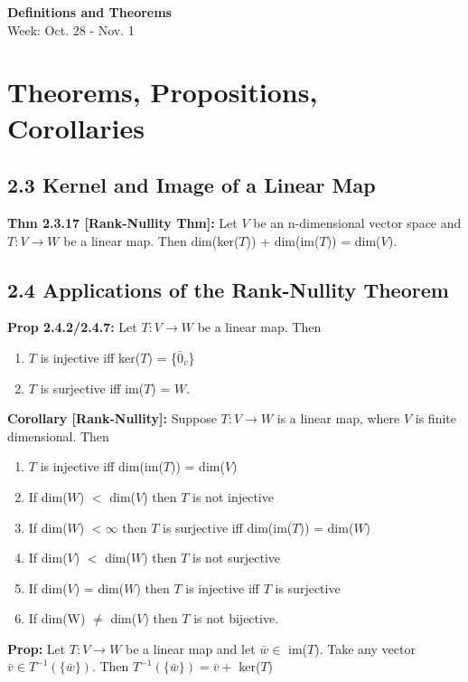 \noindent
\textbf{\LARGE Definitions and Theorems} \\
\large Week: Oct. 28 - Nov. 1

\normalsize


\section*{Theorems, Propositions, Corollaries}
\subsection*{2.3 Kernel and Image of a Linear Map}

\textbf{Thm 2.3.17 [Rank-Nullity Thm]:} Let $V$ be an n-dimensional vector space and $T: V \rightarrow W$ be a linear map. Then dim(ker($T$)) + dim(im($T$)) = dim($V$).

\subsection*{2.4 Applications of the Rank-Nullity Theorem}

\textbf{Prop 2.4.2/2.4.7:} Let $T: V \rightarrow W$ be a linear map. Then
\begin{enumerate}
    \item $T$ is injective iff ker($T$) = \{$\bar 0_v$\}
    \item $T$ is surjective iff im($T$) = $W$.
\end{enumerate}


\noindent
\textbf{Corollary [Rank-Nullity]:} Suppose $T: V \rightarrow W$ is a linear map, where $V$ is finite dimensional. Then
\begin{enumerate}
    \item $T$ is injective iff dim(im($T$)) = dim($V$) 
    \item If dim($W$) $<$ dim($V$) then $T$ is not injective
    \item If dim($W$) $< \infty$ then $T$ is surjective iff dim(im($T$)) = dim($W$)
    \item If dim($V$) $<$ dim($W$) then $T$ is not surjective
    \item If dim($V$) = dim($W$) then $T$ is injective iff $T$ is surjective
    \item If dim(W) $\ne$ dim($V$) then $T$ is not bijective.   
\end{enumerate}

\noindent 
\textbf{Prop:} Let $T: V \rightarrow W$ be a linear map and let $\bar w \in $ im($T$). Take any vector $\bar v \in T^{-1}(\{\bar w\})$. Then $T^{-1}(\{\bar w\}) = \bar v + $ ker($T$)


